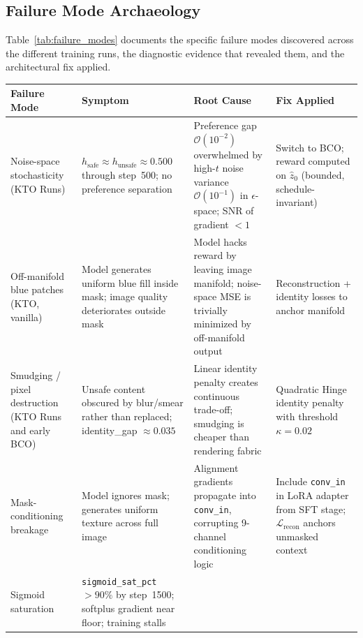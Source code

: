 \subsection{Failure Mode Archaeology}
\label{app:failure_modes}

Table~\ref{tab:failure_modes} documents the specific failure modes
discovered across the different training runs, the diagnostic evidence that
revealed them, and the architectural fix applied.

\begin{table}[!ht]
\centering
\small
\setlength{\tabcolsep}{4pt}
\begin{tabular}{p{2.6cm} p{3.6cm} p{3.8cm} p{4.0cm}}
\toprule
\textbf{Failure Mode} & \textbf{Symptom} & \textbf{Root Cause}
  & \textbf{Fix Applied} \\
\midrule
Noise-space stochasticity (KTO Runs)
  & $h_\text{safe} \approx h_\text{unsafe} \approx 0.500$
    through step~500; no preference separation
  & Preference gap $\mathcal{O}(10^{-2})$ overwhelmed by
    high-$t$ noise variance $\mathcal{O}(10^{-1})$ in $\epsilon$-space;
    SNR of gradient $< 1$
  & Switch to BCO; reward computed on $\hat{z}_0$
    (bounded, schedule-invariant) \\
\addlinespace
Off-manifold blue patches (KTO, vanilla)
  & Model generates uniform blue fill inside mask;
    image quality deteriorates outside mask
  & Model hacks reward by leaving image manifold;
    noise-space MSE is trivially minimized by off-manifold output
  & Reconstruction + identity losses to anchor manifold \\
\addlinespace
Smudging / pixel destruction (KTO Runs and early BCO)
  & Unsafe content obscured by blur/smear rather than
    replaced; identity\_gap $\approx 0.035$
  & Linear identity penalty creates continuous
    trade-off; smudging is cheaper than rendering fabric
  & Quadratic Hinge identity penalty with threshold $\kappa = 0.02$ \\
\addlinespace
Mask-conditioning breakage
  & Model ignores mask; generates uniform texture across
    full image
  & Alignment gradients propagate into \texttt{conv\_in},
    corrupting 9-channel conditioning logic
  & Include \texttt{conv\_in} in LoRA adapter from SFT
    stage; $\mathcal{L}_\text{recon}$ anchors unmasked context \\
\addlinespace
Sigmoid saturation
  & \texttt{sigmoid\_sat\_pct} $> 90\%$ by step~1500;
    softplus gradient near floor; training stalls

\end{tabular}
\end{table}
